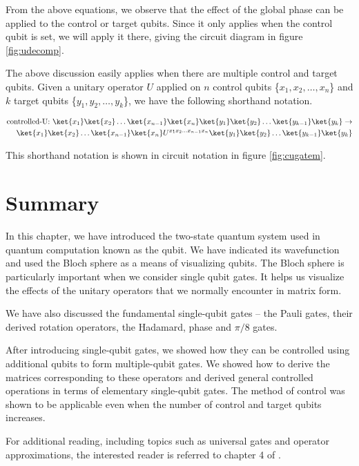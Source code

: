 From the above equations, we observe that the effect of the global phase can be applied to the control or target qubits. Since it only applies when the control qubit is set, we will apply it there, giving the circuit diagram in figure \ref{fig:udecomp}.


The above discussion easily applies when there are multiple control and target qubits. Given a unitary operator $U$ applied on $n$ control qubits \{$x_1,x_2,\ldots,x_n$\} and $k$ target qubits \{$y_1,y_2,\dots,y_k$\}, we have the following shorthand notation.

\begin{align}
\text{controlled-U: } \ket{x_1}\ket{x_2}\ldots\ket{x_{n-1}}\ket{x_n}\ket{y_1}\ket{y_2}\ldots\ket{y_{k-1}}\ket{y_k} \rightarrow\\ \ket{x_1}\ket{x_2}\ldots\ket{x_{n-1}}\ket{x_n}U^{x_1x_2\ldots x_{n-1}x_n}\ket{y_1}\ket{y_2}\ldots\ket{y_{k-1}}\ket{y_k}
\end{align}

This shorthand notation is shown in circuit notation in figure \ref{fig:cugatem}.


\section{Summary}

In this chapter, we have introduced the two-state quantum system used in quantum computation known as the qubit. We have indicated its wavefunction and used the Bloch sphere as a means of visualizing qubits. The Bloch sphere is particularly important when we consider single qubit gates. It helps us visualize the effects of the unitary operators that we normally encounter in matrix form.

We have also discussed the fundamental single-qubit gates -- the Pauli gates, their derived rotation operators, the Hadamard, phase and $\pi/8$ gates.

After introducing single-qubit gates, we showed how they can be controlled using additional qubits to form multiple-qubit gates. We showed how to derive the matrices corresponding to these operators and derived general controlled operations in terms of elementary single-qubit gates. The method of control was shown to be applicable even when the number of control and target qubits increases.

For additional reading, including topics such as universal gates and operator approximations, the interested reader is referred to chapter 4 of \cite{nielsen2000}.
